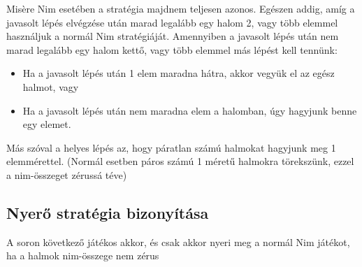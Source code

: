 Misère Nim esetében a stratégia majdnem teljesen azonos. Egészen addig, amíg a javasolt lépés elvégzése után marad legalább egy halom 2, vagy több elemmel használjuk a normál Nim stratégiáját. Amennyiben a javasolt lépés után nem marad legalább egy halom kettő, vagy több elemmel más lépést kell tennünk:
\begin{itemize}
	\item Ha a javasolt lépés után 1 elem maradna hátra, akkor vegyük el az egész halmot, vagy
	\item Ha a javasolt lépés után nem maradna elem a halomban, úgy hagyjunk benne egy elemet.
\end{itemize}
Más szóval a helyes lépés az, hogy páratlan számú halmokat hagyjunk meg 1 elemmérettel. (Normál esetben páros számú 1 méretű halmokra törekszünk, ezzel a nim-összeget zérussá téve) 


\subsection{Nyerő stratégia bizonyítása}
\begin{theorem}
	A soron következő játékos akkor, és csak akkor nyeri meg a normál Nim játékot, ha a halmok nim-összege nem zérus
\end{theorem}

